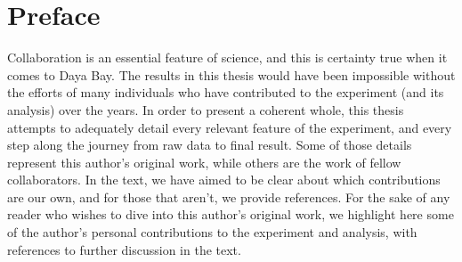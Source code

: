 \chapter*{Preface}

Collaboration is an essential feature of science, and this is certainty true when it comes to Daya Bay. The results in this thesis would have been impossible without the efforts of many individuals who have contributed to the experiment (and its analysis) over the years. In order to present a coherent whole, this thesis attempts to adequately detail every relevant feature of the experiment, and every step along the journey from raw data to final result. Some of those details represent this author's original work, while others are the work of fellow collaborators. In the text, we have aimed to be clear about which contributions are our own, and for those that aren't, we provide references. For the sake of any reader who wishes to dive into this author's original work, we highlight here some of the author's personal contributions to the experiment and analysis, with references to further discussion in the text.

